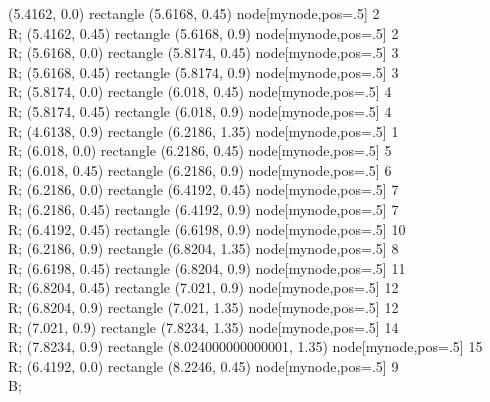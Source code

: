  (5.4162, 0.0) rectangle (5.6168, 0.45) node[mynode,pos=.5] {2 \\ R};
 (5.4162, 0.45) rectangle (5.6168, 0.9) node[mynode,pos=.5] {2 \\ R};
 (5.6168, 0.0) rectangle (5.8174, 0.45) node[mynode,pos=.5] {3 \\ R};
 (5.6168, 0.45) rectangle (5.8174, 0.9) node[mynode,pos=.5] {3 \\ R};
 (5.8174, 0.0) rectangle (6.018, 0.45) node[mynode,pos=.5] {4 \\ R};
 (5.8174, 0.45) rectangle (6.018, 0.9) node[mynode,pos=.5] {4 \\ R};
 (4.6138, 0.9) rectangle (6.2186, 1.35) node[mynode,pos=.5] {1 \\ R};
 (6.018, 0.0) rectangle (6.2186, 0.45) node[mynode,pos=.5] {5 \\ R};
 (6.018, 0.45) rectangle (6.2186, 0.9) node[mynode,pos=.5] {6 \\ R};
 (6.2186, 0.0) rectangle (6.4192, 0.45) node[mynode,pos=.5] {7 \\ R};
 (6.2186, 0.45) rectangle (6.4192, 0.9) node[mynode,pos=.5] {7 \\ R};
 (6.4192, 0.45) rectangle (6.6198, 0.9) node[mynode,pos=.5] {10 \\ R};
 (6.2186, 0.9) rectangle (6.8204, 1.35) node[mynode,pos=.5] {8 \\ R};
 (6.6198, 0.45) rectangle (6.8204, 0.9) node[mynode,pos=.5] {11 \\ R};
 (6.8204, 0.45) rectangle (7.021, 0.9) node[mynode,pos=.5] {12 \\ R};
 (6.8204, 0.9) rectangle (7.021, 1.35) node[mynode,pos=.5] {12 \\ R};
 (7.021, 0.9) rectangle (7.8234, 1.35) node[mynode,pos=.5] {14 \\ R};
 (7.8234, 0.9) rectangle (8.024000000000001, 1.35) node[mynode,pos=.5] {15 \\ R};
 (6.4192, 0.0) rectangle (8.2246, 0.45) node[mynode,pos=.5] {9 \\ B};
